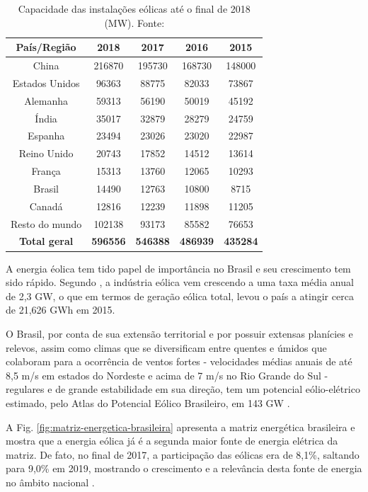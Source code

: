 \begin{table}[h]
	\centering
	\caption{Capacidade das instalações eólicas até o final de 2018 (MW). Fonte: \cite{WEI}}
	\label{tab:capacidade-instalada}
	
	\begin{tabular}{ccccc}
		\toprule
		\textbf{País/Região} & \textbf{2018} & \textbf{2017} & \textbf{2016} & \textbf{2015}\\
		\midrule
		China & 216870 & 195730 & 168730 & 148000 \\
		Estados Unidos & 96363 & 88775 & 82033 & 73867 \\
		Alemanha & 59313 & 56190 & 50019 & 45192 \\
		Índia & 35017 & 32879 & 28279 & 24759 \\
		Espanha & 23494 & 23026 & 23020 & 22987 \\
		Reino Unido & 20743 & 17852 & 14512 & 13614 \\
		França & 15313 & 13760 & 12065 & 10293 \\
        Brasil & 14490 & 12763 & 10800 & 8715 \\
        Canadá & 12816 & 12239 & 11898 & 11205 \\
        Resto do mundo & 102138 & 93173 & 85582 & 76653 \\
        \textbf{Total geral} & \textbf{596556} & \textbf{546388} & \textbf{486939} & \textbf{435284} \\
		\bottomrule
	\end{tabular}
\end{table}


A energia éolica tem tido papel de importância no Brasil e seu crescimento tem sido rápido. 
Segundo \cite{Pinto2019}, a indústria eólica vem crescendo a uma taxa média anual de 2,3 GW, o que em termos de geração eólica total, levou o país a atingir cerca de 21,626 GWh em 2015.

O Brasil, por conta de sua extensão territorial e por possuir extensas planícies e relevos, 
assim como climas que se diversificam entre quentes e úmidos que colaboram para a ocorrência de ventos fortes 
- velocidades médias anuais de até 8,5 m/s em estados do Nordeste e acima de 7 m/s no Rio Grande do Sul - 
regulares e de grande estabilidade em sua direção, tem um potencial eólio-elétrico estimado, pelo Atlas do Potencial Eólico Brasileiro, em 143 GW \cite{Pinto2019}.

A Fig. \ref{fig:matriz-energetica-brasileira} apresenta a matriz energética brasileira e mostra que a energia eólica já é a segunda maior fonte de energia elétrica da matriz. 
De fato, no final de 2017, a participação das eólicas era de 8,1\%, saltando para 9,0\% em 2019, mostrando o crescimento e a relevância desta fonte de energia no âmbito nacional \cite{ABEeolica}.

